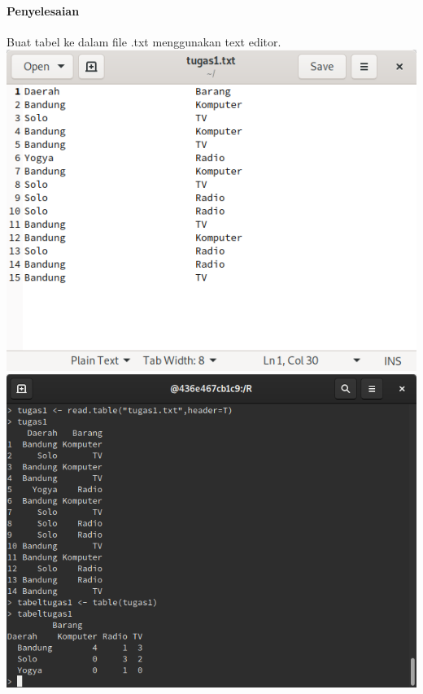 \documentclass[a4paper,12pt]{article}
\begin{document}
\paragraph{Penyelesaian\\}
Buat tabel ke dalam file .txt menggunakan text editor.\\
\includegraphics[width=\linewidth]{tugas1txt}
\includegraphics[width=\linewidth]{tugas1output}
\end{document}
